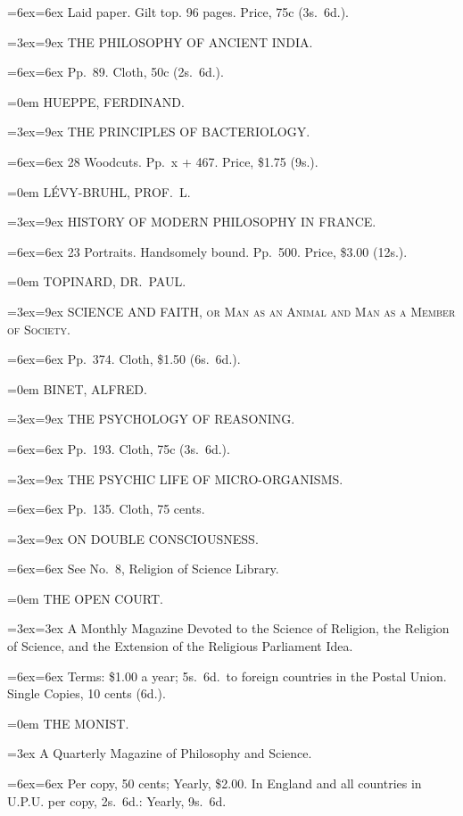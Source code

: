 \documentclass[oneside]{book}
\begin{document}
{\parindent=6ex\hangindent=6ex\footnotesize
Laid paper. Gilt top. 96 pages. Price, 75c (3s.~6d.).
\smallskip

\parindent=3ex\hangindent=9ex \small
THE PHILOSOPHY OF ANCIENT INDIA.
\nopagebreak

\parindent=6ex\hangindent=6ex\footnotesize
Pp.~89. Cloth, 50c (2s.~6d.).
\medskip


\parindent=0em \normalsize
HUEPPE, FERDINAND.
\nopagebreak

\parindent=3ex\hangindent=9ex \small
THE PRINCIPLES OF BACTERIOLOGY.
\nopagebreak

\parindent=6ex\hangindent=6ex\footnotesize
28 Woodcuts. Pp.~x + 467. Price, \$1.75 (9s.).
\medskip


\parindent=0em \normalsize
LÉVY-BRUHL, PROF.\ L.
\nopagebreak

\parindent=3ex\hangindent=9ex \small
HISTORY OF MODERN PHILOSOPHY IN FRANCE.
\nopagebreak

\parindent=6ex\hangindent=6ex\footnotesize
23 Portraits. Handsomely bound. Pp.~500. Price, \$3.00 (12s.).
\medskip


\parindent=0em \normalsize
TOPINARD, DR.\ PAUL.
\nopagebreak

\parindent=3ex\hangindent=9ex \small
SCIENCE AND FAITH, \textsc{or Man as an Animal and Man as a Member
of Society}.
\nopagebreak

\parindent=6ex\hangindent=6ex\footnotesize
Pp.~374. Cloth, \$1.50 (6s.~6d.).
\medskip


\parindent=0em \normalsize
BINET, ALFRED.
\nopagebreak

\parindent=3ex\hangindent=9ex \small
THE PSYCHOLOGY OF REASONING.
\nopagebreak

\parindent=6ex\hangindent=6ex\footnotesize
Pp.~193. Cloth, 75c (3s.~6d.).
\smallskip

\parindent=3ex\hangindent=9ex \small
THE PSYCHIC LIFE OF MICRO-ORGANISMS.
\nopagebreak

\parindent=6ex\hangindent=6ex\footnotesize
Pp.~135. Cloth, 75 cents.
\smallskip

\parindent=3ex\hangindent=9ex \small
ON DOUBLE CONSCIOUSNESS.
\nopagebreak

\parindent=6ex\hangindent=6ex\footnotesize
See No.~8, Religion of Science Library.
\medskip


\parindent=0em \normalsize
THE OPEN COURT.
\nopagebreak

\parindent=3ex\hangindent=3ex \small
A Monthly Magazine Devoted to the Science of Religion, the Religion of
Science, and the Extension of the Religious Parliament Idea.
\nopagebreak

\parindent=6ex\hangindent=6ex\footnotesize
Terms: \$1.00 a year; 5s.~6d.\ to foreign countries in the Postal Union.
Single Copies, 10 cents (6d.).
\medskip


\parindent=0em \normalsize
THE MONIST.
\nopagebreak

\parindent=3ex \small
A Quarterly Magazine of Philosophy and Science.
\nopagebreak

\parindent=6ex\hangindent=6ex\footnotesize
Per copy, 50 cents; Yearly, \$2.00. In England and all countries in
U.P.U. per copy, 2s.~6d.: Yearly, 9s.~6d.

} %
\end{document}
